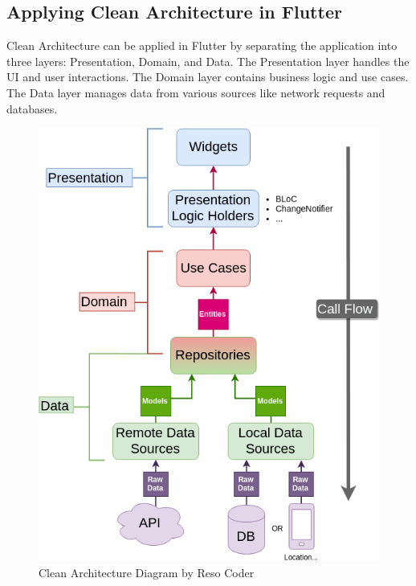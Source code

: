 \subsection{Applying Clean Architecture in Flutter}
Clean Architecture can be applied in Flutter by separating the application into three layers: Presentation, Domain, and Data. The Presentation layer handles the UI and user interactions. The Domain layer contains business logic and use cases. The Data layer manages data from various sources like network requests and databases.
\begin{figure}[H]
    \begin{minipage}{0.60\textwidth}
        \centering
        \includegraphics[width=1\linewidth]{../images/Clean-Architecture-Flutter-Diagram.png}
        \caption{Clean Architecture Diagram by Reso Coder}\label{Fig:CADRESOCODER}
    \end{minipage}\hfill
    \begin {minipage}{0.38\textwidth}
    \centering

\end{minipage}
\end{figure}
